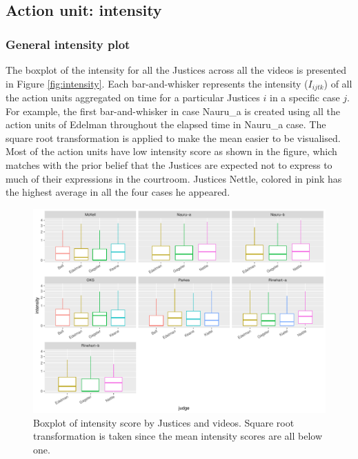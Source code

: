 \documentclass{monashthesis}
\begin{document}
\hypertarget{action-unit-intensity}{%
\subsection{Action unit: intensity}\label{action-unit-intensity}}

\hypertarget{general-intensity-plot}{%
\subsubsection{General intensity plot}\label{general-intensity-plot}}

The boxplot of the intensity for all the Justices across all the videos is presented in Figure \ref{fig:intensity}. Each bar-and-whisker represents the intensity (\(I_{ijtk}\)) of all the action units aggregated on time for a particular Justices \(i\) in a specific case \(j\). For example, the first bar-and-whisker in case Nauru\_a is created using all the action units of Edelman throughout the elapsed time in Nauru\_a case. The square root transformation is applied to make the mean easier to be visualised. Most of the action units have low intensity score as shown in the figure, which matches with the prior belief that the Justices are expected not to express to much of their expressions in the courtroom. Justices Nettle, colored in pink has the highest average in all the four cases he appeared.

\begin{figure}

{\centering \includegraphics[width=1\linewidth]{figures/intensity-boxplot-1} 

}

\caption{Boxplot of intensity score by Justices and videos. Square root transformation is taken since the mean intensity scores are all below one.  \label{fig:intensity}}\label{fig:intensity-boxplot}
\end{figure}
\end{document}
